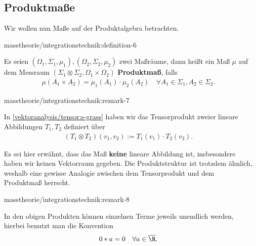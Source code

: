 \documentclass[letterpaper,10pt,german]{jupyterBook}
\begin{document}
\subsection{Produktmaße}
\label{\detokenize{masstheorie/integrationstechnik:produktmasze}}
\par
Wir wollen nun Maße auf der Produktalgebra betrachten.
\begin{definition}{}{masstheorie/integrationstechnik:definition-6}



\par
Es seien \((\Omega_1,\Sigma_1,\mu_1), (\Omega_2,\Sigma_2,\mu_2)\) zwei Maßräume, dann heißt ein Maß \(\mu\) auf dem Messraum \((\Sigma_1\otimes\Sigma_2, \Omega_1\times\Omega_2)\) \textbf{Produktmaß}, falls
\begin{align*}
\mu(A_1\times A_2) = \mu_1(A_1)\cdot\mu_2(A_2)\quad\forall A_1\in\Sigma_1, A_2\in\Sigma_2.
\end{align*}\end{definition}
\begin{remark}{}{masstheorie/integrationstechnik:remark-7}



\par
In \cref{vektoranalysis/tensor:s-grass}  haben wir das Tensorprodukt zweier lineare Abbildungen \(T_1,T_2\) definiert über
\begin{align*}
(T_1\otimes T_2)(v_1,v_2) := T_1(v_1)\cdot T_2(v_2).
\end{align*}
\par
Es sei hier erwähnt, dass das Maß \textbf{keine} lineare Abbildung ist, insbesondere haben wir keinen Vektorraum gegeben. Die Produktstruktur ist trotzdem ähnlich, weshalb eine gewisse Analogie zwischen dem Tensorprodukt und dem Produktmaß herrscht.
\end{remark}
\begin{remark}{}{masstheorie/integrationstechnik:remark-8}



\par
In den obigen Produkten können einzelnen Terme jeweils unendlich werden, hierbei benutzt man die Konvention
\begin{align*}
0 * a = 0\quad\forall a\in\overline{\R}.
\end{align*}\end{remark}
\end{document}
